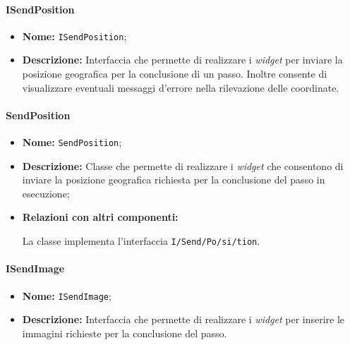 \paragraph{ISendPosition}
\begin{itemize}
\item \textbf{Nome:} \texttt{ISendPosition};
\item \textbf{Descrizione:} Interfaccia che permette  di realizzare i \textit{widget} per inviare la posizione geografica per la conclusione di un passo. Inoltre consente di visualizzare eventuali messaggi d'errore nella rilevazione delle coordinate.
\end{itemize}

\paragraph{SendPosition}
\begin{flushleft}
\begin{itemize}
\item \textbf{Nome:} \texttt{SendPosition};
\item \textbf{Descrizione:} Classe che permette  di realizzare i \textit{widget} che consentono di inviare la posizione geografica richiesta per la conclusione del passo in esecuzione;
\item \textbf{Relazioni con altri componenti:}
\begin{sloppypar}
La classe implementa l'interfaccia \texttt{I\fshyp{}Send\fshyp{}Po\fshyp{}si\fshyp{}tion}.
\end{sloppypar}
\end{itemize}
\end{flushleft}

\paragraph{ISendImage}
\begin{itemize}
\item \textbf{Nome:} \texttt{ISendImage};
\item \textbf{Descrizione:} Interfaccia che permette di realizzare i \textit{widget} per inserire le immagini richieste per la conclusione del passo.
\end{itemize}

